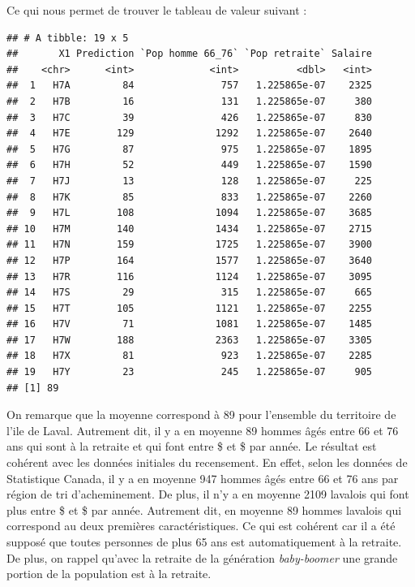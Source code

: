 \documentclass[11pt,french]{report}\usepackage[]{graphicx}\usepackage[]{color}
\makeatletter
\newenvironment{kframe}{%
 \def\at@end@of@kframe{}%
 \ifinner\ifhmode%
  \def\at@end@of@kframe{\end{minipage}}%
  \begin{minipage}{\columnwidth}%
 \fi\fi%
 \def\FrameCommand##1{\hskip\@totalleftmargin \hskip-\fboxsep
 \colorbox{shadecolor}{##1}\hskip-\fboxsep
     \hskip-\linewidth \hskip-\@totalleftmargin \hskip\columnwidth}%
 \MakeFramed {\advance\hsize-\width
   \@totalleftmargin\z@ \linewidth\hsize
   \@setminipage}}%
 {\par\unskip\endMakeFramed%
 \at@end@of@kframe}
\newenvironment{knitrout}{}{} %
\makeatother
\begin{document}
Ce qui nous permet de trouver le tableau de valeur suivant :
\begin{knitrout}
\color{fgcolor}\begin{kframe}
\begin{verbatim}
## # A tibble: 19 x 5
##       X1 Prediction `Pop homme 66_76` `Pop retraite` Salaire
##    <chr>      <int>             <int>          <dbl>   <int>
##  1   H7A         84               757   1.225865e-07    2325
##  2   H7B         16               131   1.225865e-07     380
##  3   H7C         39               426   1.225865e-07     830
##  4   H7E        129              1292   1.225865e-07    2640
##  5   H7G         87               975   1.225865e-07    1895
##  6   H7H         52               449   1.225865e-07    1590
##  7   H7J         13               128   1.225865e-07     225
##  8   H7K         85               833   1.225865e-07    2260
##  9   H7L        108              1094   1.225865e-07    3685
## 10   H7M        140              1434   1.225865e-07    2715
## 11   H7N        159              1725   1.225865e-07    3900
## 12   H7P        164              1577   1.225865e-07    3640
## 13   H7R        116              1124   1.225865e-07    3095
## 14   H7S         29               315   1.225865e-07     665
## 15   H7T        105              1121   1.225865e-07    2255
## 16   H7V         71              1081   1.225865e-07    1485
## 17   H7W        188              2363   1.225865e-07    3305
## 18   H7X         81               923   1.225865e-07    2285
## 19   H7Y         23               245   1.225865e-07     905
## [1] 89
\end{verbatim}
\end{kframe}
\end{knitrout}
On remarque que la moyenne correspond à 89 pour l'ensemble du territoire de l'ile de Laval. Autrement dit, il y a en moyenne 89 hommes âgés entre 66 et 76 ans qui sont à la retraite et qui font entre \$ et  \$  par année. Le résultat est cohérent avec les données initiales du recensement. En effet, selon les données de Statistique Canada, il y a en moyenne 947 hommes âgés entre 66 et 76 ans par région de tri d'acheminement. De plus, il n'y a en moyenne 2109 lavalois qui font plus entre  \$ et  \$  par année. Autrement dit, en moyenne 89 hommes lavalois qui correspond au deux premières caractéristiques. Ce qui est cohérent car il a été supposé que toutes personnes de plus 65 ans est automatiquement à la retraite. De plus, on rappel qu'avec la retraite de la génération \emph{baby-boomer} une grande portion de la population est à la retraite.
\end{document}
